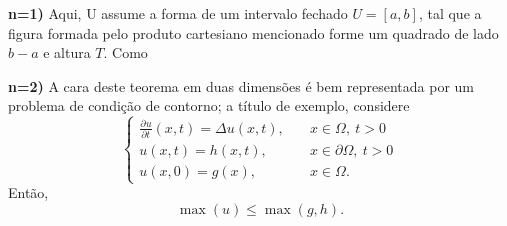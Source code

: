 \documentclass[../pde_notes.tex]{subfiles}
\begin{document}
\textbf{n=1)} Aqui, U assume a forma de um intervalo fechado \(U=[a, b]\), tal que a figura formada pelo produto cartesiano mencionado forme um quadrado de lado \(b-a\) e altura \(T\). Como

\textbf{n=2)} A cara deste teorema em duas dimensões é bem representada por um problema de condição de contorno; a título de exemplo, considere
\[
	\left\{\begin{array}{ll}
		\frac{\partial^{}u}{\partial t^{}}(x, t)=\Delta u(x, t), & \quad x\in \Omega ,\: t>0            \\
		u(x, t)=h(x, t),                                         & \quad x\in \partial \Omega ,\: t > 0 \\
		u(x, 0)=g(x),                                            & \quad x\in \Omega.
	\end{array}\right.
\]
Então,
\[
	\max_{}(u)\leq \max_{}(g, h).
\]
\end{document}
